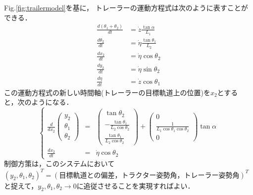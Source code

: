 Fig.\ref{fig:trailermodel}を基に，
トレーラーの運動方程式は次のように表すことができる．
\begin{align}
\frac{d(\theta_1 + \theta_2)}{dt} &= \dot{z} \frac{\tan \alpha}{L_1} \\
\frac{d\theta_2}{dt} &= \dot{\eta} \frac{\tan \theta_1}{L_2} \\
\frac{d x_2}{dt} &= \dot{\eta} \cos \theta_2 \\
\frac{d y_2}{dt} &= \dot{\eta} \sin \theta_2 \\
\frac{d \eta}{dt} &= \dot{z} \cos \theta_1
\end{align}
この運動方程式の新しい時間軸(トレーラーの目標軌道上の位置)を$x_2$とする
と，次のようになる．
\begin{equation}
 \left\{
  \begin{array}{rcl}
   \displaystyle \frac{d}{dx_2}
    \left(
     \begin{array}{c}
      y_2 \\
      \theta_1 \\
      \theta_2
     \end{array}
    \right) &=&
    \left(
     \begin{array}{c}
      \tan \theta_2 \\
      -\frac{\tan \theta_1}{L_2 \cos \theta_2} \\
      \frac{\tan \theta_1}{L_2 \cos \theta_2} 
     \end{array}
    \right) +
    \left(
     \begin{array}{c}
      0 \\
      \frac{1}{L_1 \cos \theta_1 \cos \theta_2} \\
      0
     \end{array}
    \right) \tan \alpha \\
   \displaystyle \frac{dx_2}{dt} &=& \dot{\eta} \cos \theta_2
  \end{array}\right.
\end{equation}
制御方策は，このシステムにおいて$(y_2, \theta_1, \theta_2)^T = (目標軌
道との偏差，トラクター姿勢角，トレーラー姿勢角)^T$と捉えて，$y_2, \theta_1,
\theta_2 \rightarrow 0$に追従させることを実現すればよい．

